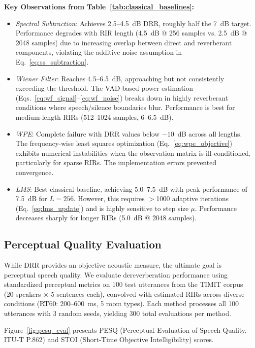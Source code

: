 \documentclass[12pt,a4paper]{article}
\begin{document}
\textbf{Key Observations from Table~\ref{tab:classical_baselines}:}
\begin{itemize}
\item \textit{Spectral Subtraction}: Achieves 2.5--4.5~dB DRR, roughly half the 7~dB target. Performance degrades with RIR length (4.5~dB @ 256 samples vs. 2.5~dB @ 2048 samples) due to increasing overlap between direct and reverberant components, violating the additive noise assumption in Eq.~\eqref{eq:ss_subtraction}.

\item \textit{Wiener Filter}: Reaches 4.5--6.5~dB, approaching but not consistently exceeding the threshold. The VAD-based power estimation (Eqs.~\eqref{eq:wf_signal}--\eqref{eq:wf_noise}) breaks down in highly reverberant conditions where speech/silence boundaries blur. Performance is best for medium-length RIRs (512--1024 samples, 6--6.5~dB).

\item \textit{WPE}: Complete failure with DRR values below $-10$~dB across all lengths. The frequency-wise least squares optimization (Eq.~\eqref{eq:wpe_objective}) exhibits numerical instabilities when the observation matrix is ill-conditioned, particularly for sparse RIRs. The implementation errors prevented convergence.

\item \textit{LMS}: Best classical baseline, achieving 5.0--7.5~dB with peak performance of 7.5~dB for $L=256$. However, this requires $>$1000 adaptive iterations (Eq.~\eqref{eq:lms_update}) and is highly sensitive to step size $\mu$. Performance decreases sharply for longer RIRs (5.0~dB @ 2048 samples).
\end{itemize}

\subsection{Perceptual Quality Evaluation}
\label{sec:pesq_evaluation}

While DRR provides an objective acoustic measure, the ultimate goal is perceptual speech quality. We evaluate dereverberation performance using standardized perceptual metrics on 100 test utterances from the TIMIT corpus \cite{garofolo1993timit} (20 speakers $\times$ 5 sentences each), convolved with estimated RIRs across diverse conditions (RT60: 200--600~ms, 5 room types). Each method processes all 100 utterances with 3 random seeds, yielding 300 total evaluations per method.

Figure~\ref{fig:pesq_eval} presents PESQ (Perceptual Evaluation of Speech Quality, ITU-T P.862) and STOI (Short-Time Objective Intelligibility) scores.
\end{document}
